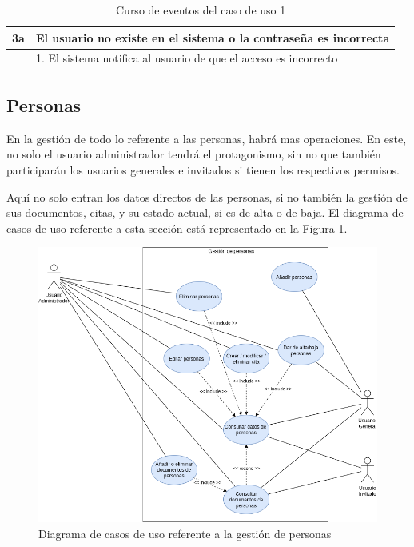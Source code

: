 \begin{table}[h!]
{\begin{tabular}{|l|l|l|l|}
        \hline
        3a & \multicolumn{3}{l|}{ El usuario no existe en el sistema o la contraseña es incorrecta }                                                                                                                                          \\ 
        \hline
        & \multicolumn{3}{l|}{1. El sistema notifica al usuario de que el acceso es incorrecto}                                                                                                                                            \\
        \hline
        \end{tabular}
    }
    \caption{Curso de eventos del caso de uso 1}
\end{table}

\newpage

\subsection{Personas}

En la gestión de todo lo referente a las personas, habrá mas operaciones. En este, no solo el usuario administrador tendrá el protagonismo, sin no que también participarán los usuarios generales e invitados si tienen los respectivos permisos.

Aquí no solo entran los datos directos de las personas, si no también la gestión de sus documentos, citas, y su estado actual, si es de alta o de baja. El diagrama de casos de uso referente a esta sección está representado en la Figura \ref{fig:cu_personas}. 

\begin{figure}[h!]
    \centering
    \includegraphics[width=1\linewidth]{diseno/sistema/CU/personas.png}
    \caption{Diagrama de casos de uso referente a la gestión de personas}
    \label{fig:cu_personas}
\end{figure}

